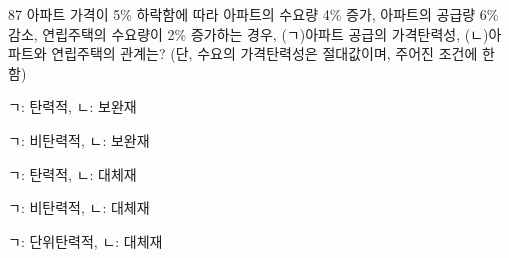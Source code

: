 \begin{question}{87}
아파트 가격이 5\% 하락함에 따라 아파트의 수요량 4\% 증가, 아파트의 공급량 6\% 감소, 연립주택의 수요량이 2\% 증가하는 경우, (ㄱ)아파트 공급의 가격탄력성, (ㄴ)아파트와 연립주택의 관계는? (단, 수요의 가격탄력성은 절대값이며, 주어진 조건에 한함)
\begin{choices}
  \item ㄱ: 탄력적, \quad ㄴ: 보완재
  \item ㄱ: 비탄력적, \quad ㄴ: 보완재
  \item ㄱ: 탄력적, \quad ㄴ: 대체재
  \item ㄱ: 비탄력적, \quad ㄴ: 대체재
  \item ㄱ: 단위탄력적, \quad ㄴ: 대체재
\end{choices}
\end{question}
